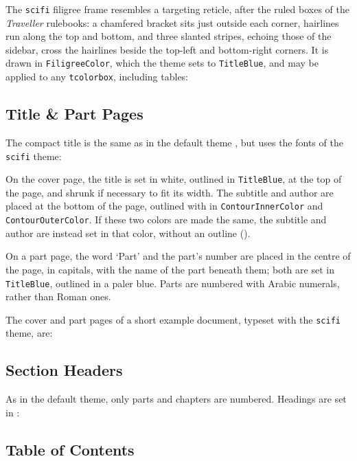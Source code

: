 				The \texttt{scifi} filigree frame  resembles a targeting reticle, after the ruled boxes of the \textit{Traveller} rulebooks: a chamfered bracket sits just outside each corner, hairlines run along the top and bottom, and three slanted stripes, echoing those of the sidebar, cross the hairlines beside the top-left and bottom-right corners. It is drawn in \texttt{FiligreeColor}, which the theme sets to \texttt{TitleBlue}, and may be applied to any \texttt{tcolorbox}, including tables:


		\subsection{Title \& Part Pages}\label{S:ScifiTitles}

			The compact title is the same as in the default theme , but uses the fonts of the \texttt{scifi} theme:


			On the cover page, the title is set in white, outlined in \texttt{TitleBlue}, at the top of the page, and shrunk if necessary to fit its width. The subtitle and author are placed at the bottom of the page, outlined with  in \texttt{ContourInnerColor} and \texttt{ContourOuterColor}. If these two colors are made the same, the subtitle and author are instead set in that color, without an outline ().

			On a part page, the word `Part' and the part's number are placed in the centre of the page, in capitals, with the name of the part beneath them; both are set in \texttt{TitleBlue}, outlined in a paler blue. Parts are numbered with Arabic numerals, rather than Roman ones.

			The cover and part pages of a short example document, typeset with the \texttt{scifi} theme, are:

		\subsection{Section Headers}

			As in the default theme, only parts and chapters are numbered. Headings are set in :


		\subsection{Table of Contents}

